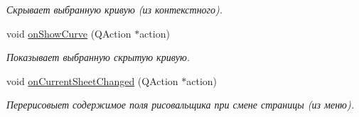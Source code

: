 \begin{DoxyCompactItemize}
\begin{DoxyCompactList}\small\item\em Скрывает выбранную кривую (из контекстного). \end{DoxyCompactList}\item 
void \hyperlink{class_graph_window_a600b5476f121fb83f2d0db599becc73a}{on\+Show\+Curve} (Q\+Action $\ast$action)\hypertarget{class_graph_window_a600b5476f121fb83f2d0db599becc73a}{}\label{class_graph_window_a600b5476f121fb83f2d0db599becc73a}

\begin{DoxyCompactList}\small\item\em Показывает выбранную скрытую кривую. \end{DoxyCompactList}\item 
void \hyperlink{class_graph_window_ad99844f68aa659cdb599681d3cd231b1}{on\+Current\+Sheet\+Changed} (Q\+Action $\ast$action)\hypertarget{class_graph_window_ad99844f68aa659cdb599681d3cd231b1}{}\label{class_graph_window_ad99844f68aa659cdb599681d3cd231b1}

\begin{DoxyCompactList}\small\item\em Перерисовыет содержимое поля рисовальщика при смене страницы (из меню). \end{DoxyCompactList}\end{DoxyCompactItemize}
